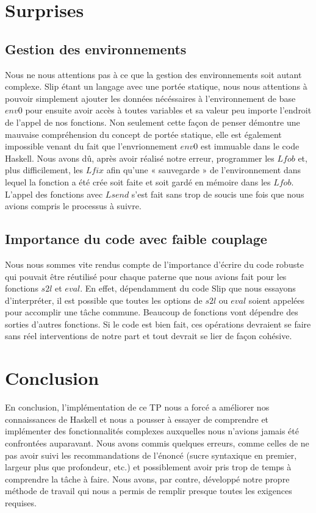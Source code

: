 \documentclass{article}
\begin{document}
	\section{Surprises}
	\subsection{Gestion des environnements}
	Nous ne nous attentions pas à ce que la gestion des environnements soit autant
	complexe. Slip étant un langage avec une portée statique, nous nous attentions
	à pouvoir simplement ajouter les données nécéssaires à l'environnement de base
	$env0$ pour ensuite avoir accès à toutes variables et sa valeur peu importe l'endroit
	de l'appel de nos fonctions. Non seulement cette façon de penser démontre une mauvaise
	compréhension du concept de portée statique, elle est également impossible
	venant du fait que l'envrionnement $env0$ est immuable dans le code Haskell. Nous
	avons dû, après avoir réalisé notre erreur, programmer les $Lfob$ et, plus
	difficilement, les $Lfix$ afin qu'une « sauvegarde » de l'environnement dans lequel
	la fonction a été crée soit faite et soit gardé en mémoire dans les $Lfob$. L'appel
	des fonctions avec $Lsend$ s'est fait sans trop de soucis une fois que nous
	avions compris le processus à suivre.

	\subsection{Importance du code avec faible couplage}
	Nous nous sommes vite rendus compte de l'importance d'écrire du code robuste
	qui pouvait être réutilisé pour chaque paterne que nous avions fait pour les
	fonctions $s2l$ et $eval$. En effet, dépendamment du code Slip que nous
	essayons d'interpréter, il est possible que toutes les options de $s2l$ ou $eva
	l$ soient appelées pour accomplir une tâche commune. Beaucoup de fonctions
	vont dépendre des sorties d'autres fonctions. Si le code est bien fait, ces
	opérations devraient se faire sans réel interventions de notre part et tout
	devrait se lier de façon cohésive.

	\section{Conclusion}
	En conclusion, l'implémentation de ce TP nous a forcé a améliorer nos connaissances
	de Haskell et nous a pousser à essayer de comprendre et implémenter des fonctionnalités
	complexes auxquelles nous n'avions jamais été confrontées auparavant. Nous
	avons commis quelques erreurs, comme celles de ne pas avoir suivi les recommandations
	de l'énoncé (sucre syntaxique en premier, largeur plus que profondeur, etc.) et possiblement avoir pris trop de temps à comprendre la tâche à faire.
	Nous avons, par contre, développé notre propre méthode de travail qui nous a
	permis de remplir presque toutes les exigences requises.
\end{document}
